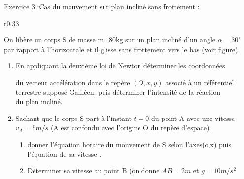 \documentclass[12pt, french]{article}
\begin{document}
\begin{Box2}{Exercice 3 :Cas du mouvement sur plan incliné sans frottement : }


\begin{wrapfigure}[3]{r}{0.33\textwidth}
	\vspace{-0.8cm}
	\newcommand{\ang}{30}
 
\end{wrapfigure}
	On libère un corps S de masse m=80kg sur un plan incliné d'un angle $\alpha =30^{\circ}$
par rapport à l'horizontale et il glisse sans
frottement vers le bas (voir figure).


\begin{enumerate}
	\item  En appliquant la deuxième loi de Newton déterminer les coordonnées 

		du vecteur accélération dans le repère $(O,x,y)$ associé
à un référentiel \\terrestre supposé Galiléen. puis déterminer l'intensité de la réaction \\du plan incliné.
\item  Sachant que le corps S part à l'instant $t=0$ du point A avec une vitesse $v_A= 5m/s$ (A est confondu avec l'origine O du repère
d'espace).
\begin{enumerate}
	\item donner l'équation horaire du mouvement de S selon l'axes(o,x) puis l'équation de sa vitesse .
	\item Déterminer sa vitesse au point B (on donne $AB=2m$ et $g=10m/s^2$
	\end{enumerate}
\end{enumerate}




\end{Box2}
\end{document}
